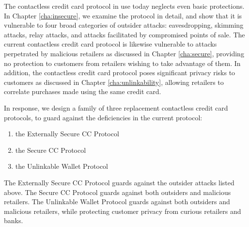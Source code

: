 The contactless credit card protocol in use today neglects even basic protections.
In Chapter \ref{cha:insecure}, we examine the protocol in detail, and show that it is vulnerable to four broad categories of outsider attacks:
  eavesdropping, skimming attacks, relay attacks, and attacks facilitated by compromised points of sale.
The current contactless credit card protocol is likewise vulnerable to attacks perpetrated by malicious retailers as discussed in Chapter \ref{cha:secure},
    providing no protection to customers from retailers wishing to take advantage of them.
In addition, the contactless credit card protocol poses significant privacy risks to customers as discussed in Chapter \ref{cha:unlinkability},
    allowing retailers to correlate purchases made using the same credit card.

In response, we design a family of three replacement contactless credit card protocols, to guard against the deficiencies in the current protocol:
\begin{enumerate}
    \item the Externally Secure CC Protocol
    \item the Secure CC Protocol
    \item the Unlinkable Wallet Protocol
\end{enumerate}
The Externally Secure CC Protocol guards against the outsider attacks listed above.
The Secure CC Protocol guards against both outsiders and malicious retailers.
The Unlinkable Wallet Protocol guards against both outsiders and malicious retailers, while protecting customer privacy from curious retailers and banks.

